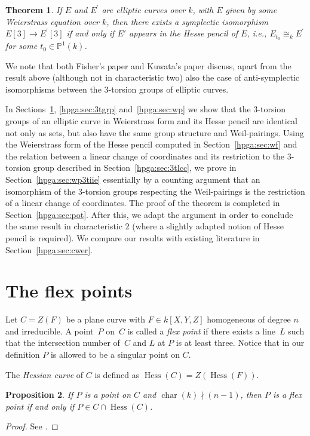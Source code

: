 \documentclass[pdftex]{sigma}
\newcommand{\mpp}{{\mathbb{P}}}
\newcommand{\msetp}[1]{{\left({#1}\right)}}					%
\newcommand{\msets}[1]{{\left[{#1}\right]}}					%
\newcommand{\mchar}[1]{\operatorname{char}\msetp{#1}}			%
\newcommand{\mhess}[1]{\operatorname{Hess}\msetp{#1}}			%
\newcommand{\mps}[2]{{\mpp^{#1}\msetp{#2}}}						%
\numberwithin{equation}{section}
\newtheorem{Theorem}{Theorem}[section]
\newtheorem{Proposition}[Theorem]{Proposition}
\begin{document}
\begin{Theorem}\label{hpga:thm:mt} If $E$ and $E^\prime$ are elliptic curves over $k$, with $E$ given by some Weierstrass equation over $k$, then there exists a symplectic isomorphism $E\msets{3}\rightarrow E^\prime\msets{3}$ if and only if $E'$ appears in the Hesse pencil of $E$, i.e., $E_{t_0}\cong_kE^\prime$ for some $t_0\in\mps{1}{k}$.
\end{Theorem}

We note that both Fisher's paper \cite{fisher2012} and Kuwata's paper \cite{kuwata2012} discuss, apart from the result above (although not in characteristic two) also the case of anti-symplectic isomorphisms between the $3$-torsion groups of elliptic curves.

In Sections~\ref{hpga:sec:fp}, \ref{hpga:sec:3tgrp} and~\ref{hpga:sec:wp} we show that the 3-torsion groups of an elliptic curve in Weierstrass form and its Hesse pencil are identical not only as sets, but also have the same group structure and Weil-pairings. Using the Weierstrass form of the Hesse pencil computed in Section~\ref{hpga:sec:wf} and the relation between a linear change of coordinates and its restriction to the 3-torsion group described in Section~\ref{hpga:sec:3tlcc}, we prove in Section~\ref{hpga:sec:wp3tiie} essentially by a counting argument that an
isomorphism of the 3-torsion groups respecting the Weil-pairings is the restriction of a linear change of coordinates. The proof of the theorem is completed in Section~\ref{hpga:sec:pot}. After this, we adapt the argument in order to conclude the same result in characteristic $2$ (where a slightly adapted notion of Hesse pencil is required). We compare our results with existing literature in Section~\ref{hpga:sec:cwer}.

\section{The flex points}\label{hpga:sec:fp}

Let $C=Z\msetp{F}$ be a plane curve with $F\in k\msets{X,Y,Z}$ homogeneous of degree $n$ and irreducible. A point~$P$ on~$C$ is called a \emph{flex point} if there exists a line~$L$ such that the intersection number of~$C$ and $L$ at $P$ is at least three. Notice that in our definition $P$ is allowed to be a singular point on $C$.

The \emph{Hessian curve} of $C$ is defined as $\mhess{C}=Z\msetp{\mhess{F}}$.

\begin{Proposition}\label{two} If $P$ is a point on $C$ and $\mchar{k}\nmid (n-1)$, then $P$ is a flex point if
and only if $P\in C\cap\mhess{C}$.
\end{Proposition}
\begin{proof}See \cite[Exercise 5.23]{fulton2008}.
\end{proof}
\end{document}
